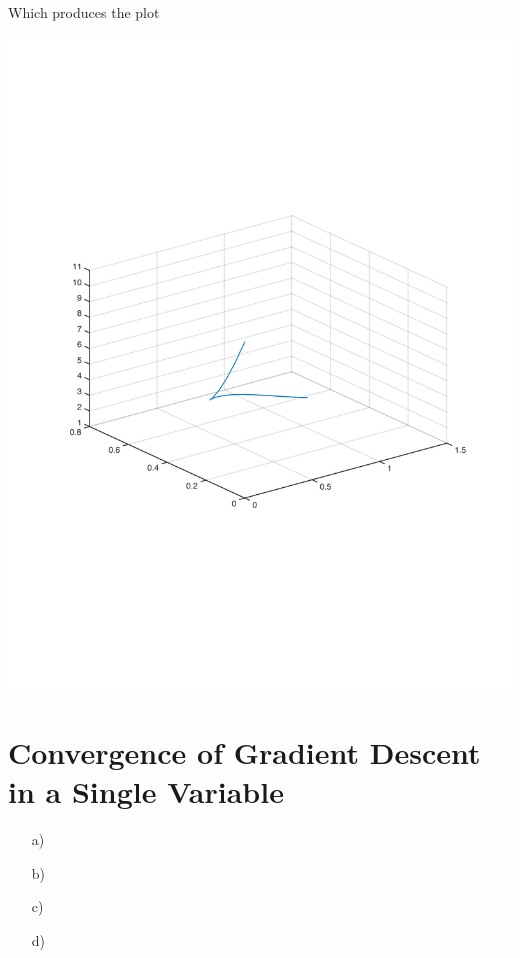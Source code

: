 \documentclass[11pt]{article}
\begin{document}
\begin{itemize}
        Which produces the plot
        \begin{center}
        \includegraphics[width=\linewidth]{2c}
        \end{center}

\end{itemize}

\section{Convergence of Gradient Descent in a Single Variable}
\begin{itemize}
    \item[a)]
    \item[b)]
    \item[c)]
    \item[d)]
\end{itemize}
\end{document}
